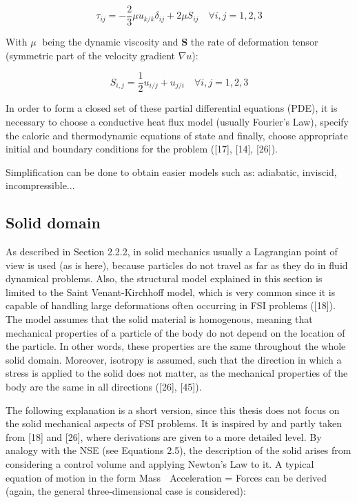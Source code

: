 \begin{equation}
	\tau_{ij} = -\frac{2}{3}\mu u_{k/k} \delta_{ij}+2\mu S_{ij} \quad \forall i,j = 1,2,3
\end{equation}


With $\mu$ being the dynamic viscosity and \textbf{S} the rate of deformation tensor (symmetric part of the velocity gradient $\nabla u$):

\begin{equation}
	S_{i,j} = \frac{1}{2}u_{i/j}+u_{j/i} \quad \forall i,j = 1,2,3
\end{equation}

In order to form a closed set of these partial differential equations (PDE), it is necessary to choose a
conductive heat flux model (usually Fourier’s Law), specify the caloric and thermodynamic equations of
state and finally, choose appropriate initial and boundary conditions for the problem ([17], [14], [26]).

Simplification can be done to obtain easier models such as: adiabatic, inviscid, incompressible...


\subsection{Solid domain}

As described in Section 2.2.2, in solid mechanics usually a Lagrangian point of view is used (as is here),
because particles do not travel as far as they do in fluid dynamical problems. Also, the structural model
explained in this section is limited to the Saint Venant-Kirchhoff model, which is very common since
it is capable of handling large deformations often occurring in FSI problems ([18]). The model assumes
that the solid material is homogenous, meaning that mechanical properties of a particle of the body do
not depend on the location of the particle. In other words, these properties are the same throughout the
whole solid domain. Moreover, isotropy is assumed, such that the direction in which a stress is applied
to the solid does not matter, as the mechanical properties of the body are the same in all directions ([26],
[45]).

The following explanation is a short version, since this thesis does not focus on the solid mechanical
aspects of FSI problems. It is inspired by and partly taken from [18] and [26], where derivations are given
to a more detailed level.
By analogy with the NSE (see Equations 2.5), the description of the solid arises from considering a control
volume and applying Newton’s Law to it. A typical equation of motion in the form Mass  Acceleration
= Forces can be derived (again, the general three-dimensional case is considered):

